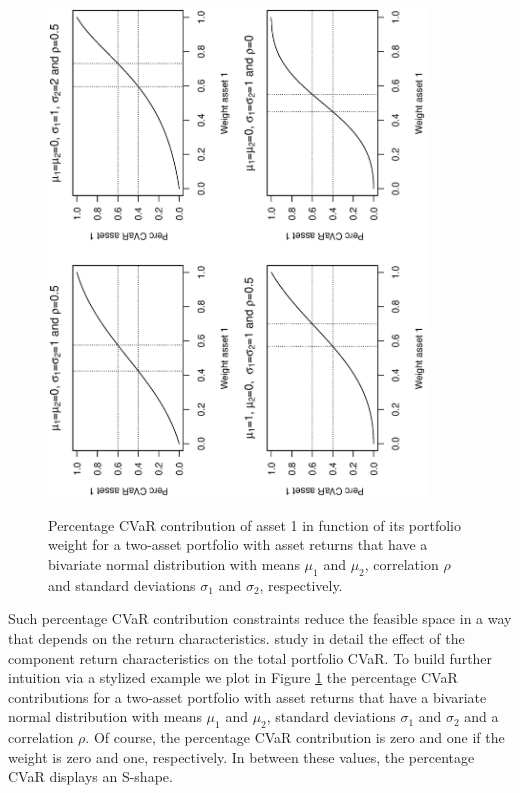 \documentclass[12pt,a4paper]{article}
\begin{document}
\begin{figure}[tb]
\begin{center}
\caption{Percentage CVaR contribution of asset 1 in function of its portfolio weight for a two-asset portfolio with asset returns that have a bivariate normal distribution with means $\mu_1$ and $\mu_2$, correlation $\rho$ and standard deviations $\sigma_1$ and $\sigma_2$, respectively.   }
\includegraphics[width=10cm,angle=270]{sensitivity_rho50.eps } \label{fig:sensitivityfixedrho}
\end{center}
\end{figure}

Such percentage CVaR contribution constraints reduce the feasible space in a way that depends on the return characteristics. \citet{Stoyanov2009} study in detail the effect of the component return characteristics on the total portfolio CVaR. To build further intuition via a stylized example we plot in Figure \ref{fig:sensitivityfixedrho} the percentage CVaR contributions for a two-asset portfolio with asset returns that have a bivariate normal distribution with means $\mu_1$  and $\mu_2$, standard deviations $\sigma_1$ and $\sigma_2$  and a correlation $\rho$. Of course, the percentage CVaR contribution is zero and one if the weight is zero and one, respectively. In between these values, the percentage CVaR displays an S-shape.
\end{document}
